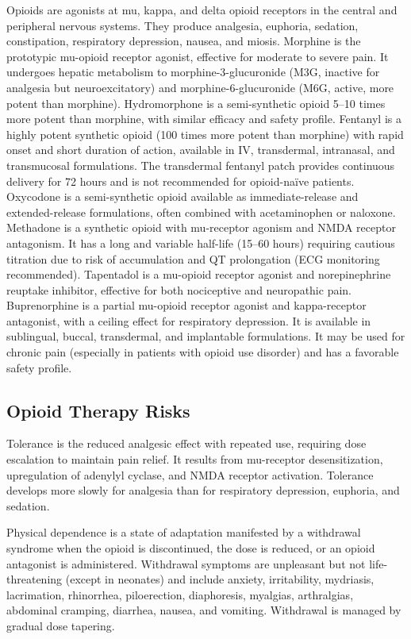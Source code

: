 Opioids are agonists at mu, kappa, and delta opioid receptors in the central and peripheral nervous systems. They produce analgesia, euphoria, sedation, constipation, respiratory depression, nausea, and miosis. Morphine is the prototypic mu-opioid receptor agonist, effective for moderate to severe pain. It undergoes hepatic metabolism to morphine-3-glucuronide (M3G, inactive for analgesia but neuroexcitatory) and morphine-6-glucuronide (M6G, active, more potent than morphine). Hydromorphone is a semi-synthetic opioid 5--10 times more potent than morphine, with similar efficacy and safety profile. Fentanyl is a highly potent synthetic opioid (100 times more potent than morphine) with rapid onset and short duration of action, available in IV, transdermal, intranasal, and transmucosal formulations. The transdermal fentanyl patch provides continuous delivery for 72 hours and is not recommended for opioid-na{\"i}ve patients. Oxycodone is a semi-synthetic opioid available as immediate-release and extended-release formulations, often combined with acetaminophen or naloxone. Methadone is a synthetic opioid with mu-receptor agonism and NMDA receptor antagonism. It has a long and variable half-life (15--60 hours) requiring cautious titration due to risk of accumulation and QT prolongation (ECG monitoring recommended). Tapentadol is a mu-opioid receptor agonist and norepinephrine reuptake inhibitor, effective for both nociceptive and neuropathic pain. Buprenorphine is a partial mu-opioid receptor agonist and kappa-receptor antagonist, with a ceiling effect for respiratory depression. It is available in sublingual, buccal, transdermal, and implantable formulations. It may be used for chronic pain (especially in patients with opioid use disorder) and has a favorable safety profile.

\subsection{Opioid Therapy Risks}
\label{sec:Opioid Therapy Risks}

Tolerance is the reduced analgesic effect with repeated use, requiring dose escalation to maintain pain relief. It results from mu-receptor desensitization, upregulation of adenylyl cyclase, and NMDA receptor activation. Tolerance develops more slowly for analgesia than for respiratory depression, euphoria, and sedation.

Physical dependence is a state of adaptation manifested by a withdrawal syndrome when the opioid is discontinued, the dose is reduced, or an opioid antagonist is administered. Withdrawal symptoms are unpleasant but not life-threatening (except in neonates) and include anxiety, irritability, mydriasis, lacrimation, rhinorrhea, piloerection, diaphoresis, myalgias, arthralgias, abdominal cramping, diarrhea, nausea, and vomiting. Withdrawal is managed by gradual dose tapering.

